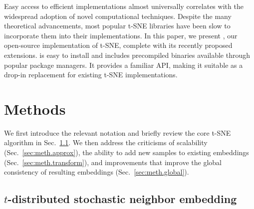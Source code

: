 \documentclass[article]{jss}
\newcommand{\opentsne}{\pkg{openTSNE}\xspace}
\begin{document}
Easy access to efficient implementations almost universally correlates with the widespread adoption of novel computational techniques. Despite the many theoretical advancements, most popular t-SNE libraries have been slow to incorporate them into their implementations. In this paper, we present \opentsne, our open-source  implementation of t-SNE, complete with its recently proposed extensions. \opentsne is easy to install and includes precompiled binaries available through popular  package managers. It provides a familiar API, making it suitable as a drop-in replacement for existing t-SNE implementations.



\section{Methods} \label{sec:methods}

We first introduce the relevant notation and briefly review the core t-SNE
algorithm in Sec.~\ref{sec:meth.tsne}. We then address the criticisms of
scalability (Sec.~\ref{sec:meth.approx}), the ability to add new samples to
existing embeddings (Sec.~\ref{sec:meth.transform}), and improvements that
improve the global consistency of resulting embeddings
(Sec.~\ref{sec:meth.global}).

\subsection{$t$-distributed stochastic neighbor embedding} \label{sec:meth.tsne}
\end{document}
